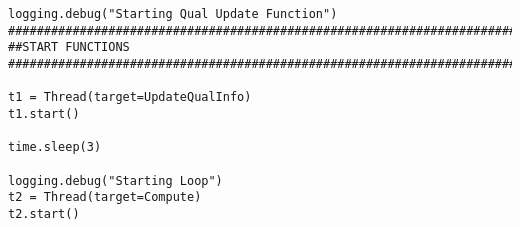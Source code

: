 \begin{lstlisting}
logging.debug("Starting Qual Update Function")
##############################################################################
##START FUNCTIONS
##############################################################################

t1 = Thread(target=UpdateQualInfo)
t1.start()

time.sleep(3)

logging.debug("Starting Loop")
t2 = Thread(target=Compute)
t2.start()
\end{lstlisting}